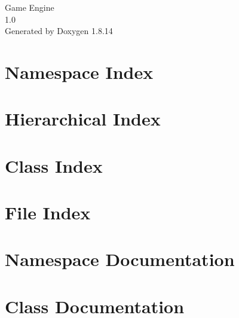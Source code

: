 \documentclass[twoside]{book}
\newcommand{\+}{\discretionary{\mbox{\scriptsize$\hookleftarrow$}}{}{}}
\newcommand{\clearemptydoublepage}{%
  \newpage{\pagestyle{empty}\cleardoublepage}%
}
\begin{document}
\hypersetup{pageanchor=false,
             bookmarksnumbered=true,
             pdfencoding=unicode
            }
\begin{titlepage}
\vspace*{7cm}
\begin{center}%
{\Large Game Engine \\[1ex]\large 1.\+0 }\\
\vspace*{1cm}
{\large Generated by Doxygen 1.8.14}\\
\end{center}
\end{titlepage}
\clearemptydoublepage
{}
\tableofcontents
\clearemptydoublepage
{}
\hypersetup{pageanchor=true}

\chapter{Namespace Index}

\chapter{Hierarchical Index}

\chapter{Class Index}

\chapter{File Index}

\chapter{Namespace Documentation}

\chapter{Class Documentation}




























\end{document}
